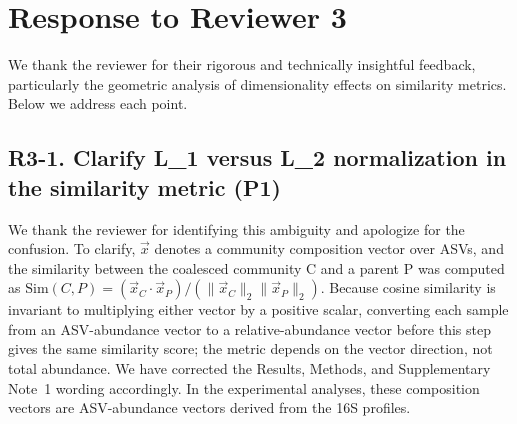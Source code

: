 \section*{Response to Reviewer 3}

We thank the reviewer for their rigorous and technically insightful feedback, particularly the geometric analysis of dimensionality effects on similarity metrics. Below we address each point.

\subsection*{R3-1. Clarify L\_1 versus L\_2 normalization in the similarity metric (P1)}


\responselabel
We thank the reviewer for identifying this ambiguity and apologize for the confusion. To clarify, $\vec{x}$ denotes a community composition vector over ASVs, and the similarity between the coalesced community C and a parent P was computed as $\mathrm{Sim}(C,P) = (\vec{x}_C \cdot \vec{x}_P)/(\|\vec{x}_C\|_2\|\vec{x}_P\|_2)$. Because cosine similarity is invariant to multiplying either vector by a positive scalar, converting each sample from an ASV-abundance vector to a relative-abundance vector before this step gives the same similarity score; the metric depends on the vector direction, not total abundance. We have corrected the Results, Methods, and Supplementary Note~1 wording accordingly. In the experimental analyses, these composition vectors are ASV-abundance vectors derived from the 16S profiles.


